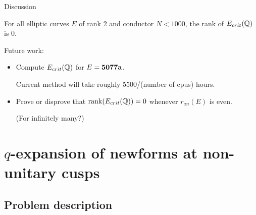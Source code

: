 \documentclass[handout]{beamer}
\begin{document}
\begin{frame}{Discussion}

\begin{Corollary}
For all elliptic curves $E$ of rank 2 and conductor $N <1000$, the rank of $E_{crit}(\mathbb{Q})$ is 0.
\end{Corollary}
\pause
\smallskip
Future work: 
\begin{itemize}
\item Compute $E_{crit}(\mathbb{Q})$ for $E = {\bf 5077a}$. 

Current method will take roughly  5500/(number of cpus) hours.  

\item Prove or disprove that $\rank(E_{crit}(\mathbb{Q})) = 0$ whenever $r_{an}(E)$ is even.

(For infinitely many?) 

\end{itemize}

\end{frame}







\section{$q$-expansion of newforms at non-unitary cusps} 

 \begin{frame}
 \frametitle{\insertsection}
 \tableofcontents[currentsection]
 \end{frame}


\subsection{Problem description}
\end{document}
